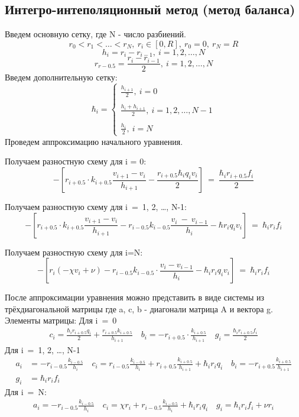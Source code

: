 \subsection{Интегро-интеполяционный метод (метод баланса)}

Введем основную сетку, где N - число разбиений.
\[r_0 < r_1 < \dots < r_N,\ r_i \in [0, R],\ r_0 = 0,\ r_N = R\]
\[
  h_i =r_i - r_{i-1},\ i=1,2, \dots, N
\]
\[
  r_{r-0.5} = \frac{r_i - r_{i-1}}{2},\ i=1,2, \dots, N
\]
Введем дополнительную сетку:
\[
  \hbar_i = \begin{cases}
    \frac{h_{i+1}}{2},\ i = 0 \\ \\
    \frac{h_i + h_{i+1}}{2},\ i = 1, 2, \dots, N-1 \\ \\
    \frac{h_i}{2},\ i = N
  \end{cases}
\]
Проведем аппроксимацию начального уравнения.

Получаем разностную схему для i = 0:
\[
  -\left[ r_{i+0.5} \cdot k_{i+0.5}\frac{v_{i+1}-v_i}{h_{i+1}} - \frac{r_{i+0.5} \hbar_i q_i v_i}{2} \right]\ =\ \frac{\hbar_i r_{i+0.5} f_i}{2}
\]

Получаем разностную схему для i\ =\ 1, 2, \dots, N-1:
\[
  -\left[ r_{i+0.5} \cdot k_{i+0.5}\frac{v_{i+1}-v_i}{h_{i+1}} - r_{i-0.5}k_{i-0.5}\frac{v_{i}\ -\ v_{i-1}}{h_{i}} - \hbar r_i q_i v_i\right]\ =\ \hbar_ir_if_i
\]

Получаем разностную схему для i=N:
\[
  -\left[ r_i (-\chi v_i + \nu) - r_{i-0.5}k_{i-0.5} \cdot \frac{v_i-v_{i-1}}{h_i}- \hbar_ir_iq_iv_i \right]\ =\ \hbar_ir_if_i
\]

После аппроксимации уравнения можно представить в виде системы из трёхдиагональной матрицы где a, c, b - диагонали матрица A и вектора g. Элементы матрицы:\newline
Для i\ =\ 0
\begin{align*}
  c_i = \frac{\hbar_i r_{i+0.5} q_i}{2} + \frac{r_{i+0.5} k_{i+0.5}}{h_{i+1}} \quad
  b_i = -r_{i+0.5} \cdot \frac{k_{i+0.5}}{h_{i+1}} \quad
  g_i = \frac{\hbar_i r_{i+0.5} f_i}{2}
\end{align*}
Для i\ =\ 1, 2, \dots, N-1
\begin{align*}
  a_i &= -r_{i-0.5}\frac{k_{i-0.5}}{h_i} \quad
  c_i = r_{i-0.5}\frac{k_{i-0.5}}{h_i} + r_{i+0.5}\frac{k_{i+0.5}}{h_{i+1}} + \hbar_i r_iq_i \quad
  b_i = -r_{i+0.5}\frac{k_{i+0.5}}{h_{i+1}} \\
  g_i &= \hbar_i r_i f_i
\end{align*}
Для i\ =\ N:
\begin{align*}
  a_i = -r_{i-0.5}\frac{k_{i-0.5}}{h_i} \quad
  c_i = \chi r_i + r_{i-0.5}\frac{k_{i-0.5}}{h_i} + \hbar_i r_iq_i \quad
  g_i = \hbar_i r_i f_i + \nu r_i
\end{align*}

